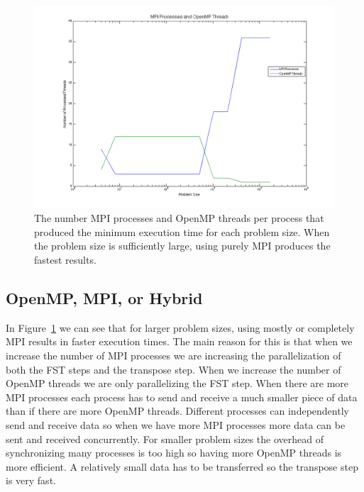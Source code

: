 \documentclass{article}
\begin{document}
	\begin{figure}[htbp]
	\begin{center}
	\includegraphics[width=15cm,keepaspectratio=true]{figs/threadsProcesses}
	\caption{The number MPI processes and OpenMP threads per process that produced the minimum execution time for each problem size. When the problem size is sufficiently large, using purely MPI produces the fastest results.}
	\label{fig:threadsProcesses}
	\end{center}
	\end{figure}

\subsection{OpenMP, MPI, or Hybrid}

	In Figure~\ref{fig:threadsProcesses} we can see that for larger problem sizes, using mostly or completely MPI results in faster execution times. The main reason for this is that when we increase the number of MPI processes we are increasing the parallelization of both the FST steps and the transpose step. When we increase the number of OpenMP threads we are only parallelizing the FST step. When there are more MPI processes each process has to send and receive a much smaller piece of data than if there are more OpenMP threads. Different processes can independently send and receive data so when we have more MPI processes more data can be sent and received concurrently. For smaller problem sizes the overhead of synchronizing many processes is too high so having more OpenMP threads is more efficient. A relatively small data has to be transferred so the transpose step is very fast.
\end{document}
